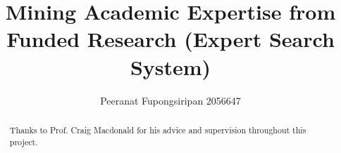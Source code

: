 \documentclass[a4paper,10pt]{article}
\title{Mining Academic Expertise from Funded Research (Expert Search System)}
\author{Peeranat Fupongsiripan 2056647}
\begin{document}
\maketitle

\begin{abstract}

\end{abstract}


\renewcommand{\abstractname}{Acknowledgements}
\begin{abstract}
Thanks to Prof. Craig Macdonald for his advice and supervision throughout this project. 
\end{abstract}

\tableofcontents
















\end{document}
